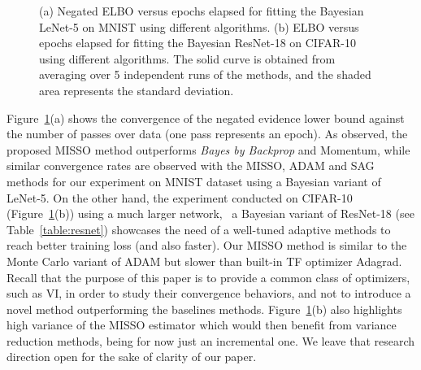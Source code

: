 \documentclass[11pt]{article}
\theoremstyle{t}
\begin{document}
\vspace{-.3cm}
\begin{figure}[H]
    \centering
    \qquad
  \caption{(a)  Negated ELBO versus epochs elapsed for fitting the Bayesian LeNet-5 on MNIST using different algorithms.
(b)  ELBO versus epochs elapsed for fitting the Bayesian ResNet-18 on CIFAR-10 using different algorithms.
The solid curve is obtained from averaging over 5 independent runs of the methods, and the shaded area represents the standard deviation.}\label{fig:lenetopt}
\end{figure}



Figure~\ref{fig:lenetopt}(a) shows the convergence of the negated evidence lower bound against the number of passes over data (one pass represents an epoch). As observed, the proposed MISSO method outperforms \textit{Bayes by Backprop} and Momentum, while similar convergence rates are observed with the MISSO, ADAM and SAG methods for our experiment on MNIST dataset using a Bayesian variant of LeNet-5. 
On the other hand, the experiment conducted on CIFAR-10 (Figure~\ref{fig:lenetopt}(b)) using a much larger network, \ie\ a Bayesian variant of ResNet-18 (see Table~\ref{table:resnet}) showcases the need of a well-tuned adaptive methods to reach better training loss (and also faster). Our MISSO method is similar to the Monte Carlo variant of ADAM but slower than built-in TF optimizer Adagrad. Recall that the purpose of this paper is to provide a common class of optimizers, such as VI, in order to study their convergence behaviors, and not to introduce a novel method outperforming the baselines methods.
Figure~\ref{fig:lenetopt}(b) also highlights high variance of the MISSO estimator which would then benefit from variance reduction methods, being for now just an incremental one. We leave that research direction open for the sake of clarity of our paper.
\end{document}
